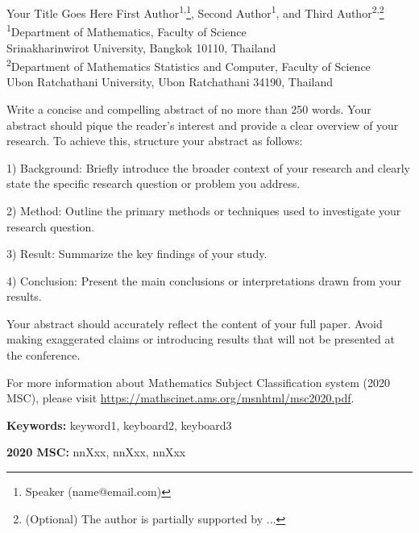 \documentclass[12pt, a4paper]{article}
\newenvironment{AMM-abstract}[4][]{
  \begin{center}
    { \renewcommand\textsuperscript[1]{}\par}
    {{\Large\bfseries #2}\par}
    \medskip
    {\large #3\par}
    \bigskip
    {\small #4\par}
    \bigskip\bigskip
    {{\large\bfseries Abstract}\par}
  \end{center}
}{ 
  \bigskip
  \hrule
  \bigskip
}
\newcommand{\mykeywords}[1]{%
    \noindent \textbf{Keywords:} #1 \par
}
\newcommand{\myMSC}[1]{
    \noindent \textbf{2020 MSC:} #1 \par
}
\begin{document}
%
%

\begin{AMM-abstract}[]
{Your Title Goes Here} %
{First Author\textsuperscript{1,}\footnote{Speaker (name@email.com)}, Second Author\textsuperscript{1}, and Third Author\textsuperscript{2,}\footnote{(Optional) The author is partially supported by ...}} %
{\textsuperscript{1}Department of Mathematics, Faculty of Science\\Srinakharinwirot University,
Bangkok 10110, Thailand\\ \smallskip
\textsuperscript{2}Department of Mathematics Statistics and Computer, Faculty of Science\\
Ubon Ratchathani University, Ubon Ratchathani 34190, Thailand} %

Write a concise and compelling abstract of no more than 250 words. Your abstract should pique the reader's interest and provide a clear overview of your research.
To achieve this, structure your abstract as follows:

1) Background: Briefly introduce the broader context of your research and clearly state the specific research question or problem you address.
 
2) Method: Outline the primary methods or techniques used to investigate your research question.
 
3) Result: Summarize the key findings of your study.
 
4) Conclusion: Present the main conclusions or interpretations drawn from your results.
 
Your abstract should accurately reflect the content of your full paper. Avoid making exaggerated claims or introducing results that will not be presented at the conference.

For more information about Mathematics Subject Classification system (2020 MSC), please visit \url{https://mathscinet.ams.org/msnhtml/msc2020.pdf}.
\end{AMM-abstract}


\mykeywords{keyword1, keyboard2, keyboard3} %
\smallskip
\myMSC{nnXxx, nnXxx, nnXxx} %
\end{document}
